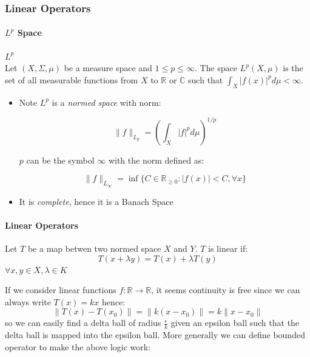 \subsubsection{Linear Operators}

\paragraph{$L^p$ Space}

\begin{definition}[ space]\textbf{$L^p$}\\
Let $(X,\Sigma, \mu)$ be a measure space and $1\leq p\leq \infty$. The space $L^p(X,\mu)$ is the set of all measurable functions from $X$ to $\mathbb{R}$ or $\mathbb{C}$ such that $\int_X |f(x)|^p d\mu < \infty$.

\begin{itemize}
\item Note $L^p$ is a \textit{normed space} with norm:

\begin{equation}
\|f\|_{L_p}=\left(\int_X |f|^p d\mu\right)^{1/p}
\end{equation}


$p$ can be the symbol $\infty$ with the norm defined as:

\begin{equation}
\|f\|_{L_{\infty}} = \inf\{C\in \mathbb{R}_{\geq 0} : |f(x)|<C, \forall x\}
\end{equation}


\item It is \textit{complete}, hence it is a Banach Space
\end{itemize}

\end{definition}\paragraph{Linear Operators}

\begin{definition}Let $T$ be a map betwen two normed space $X$ and $Y$. $T$ is linear if:
\begin{equation}
T(x+\lambda y) = T(x) +\lambda T(y)
\end{equation}
$\forall x,y \in X, \lambda \in K$

\end{definition}If we consider linear functions $f:\mathbb{R}\to \mathbb{R}$, it seems continuity is free since we can always write $T(x)=kx$ hence:
\begin{equation}
\|T(x)-T(x_0)\|=\|k(x-x_0)\|=k\|x-x_0\|
\end{equation}
so we can easily find a delta ball of radius $\frac{\epsilon}{k}$ given an epsilon ball such that the delta ball is mapped into the epsilon ball. More generally we can define bounded operator to make the above logic work:

